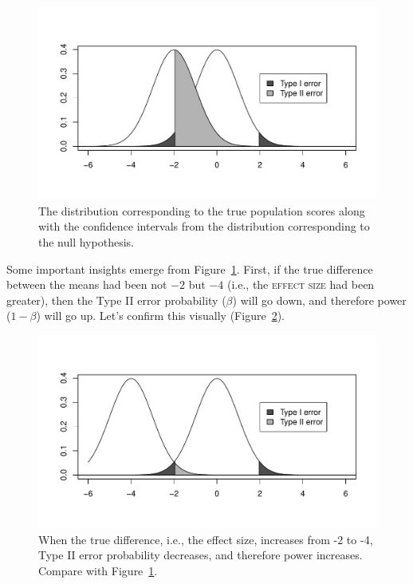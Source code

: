\documentclass[12pt]{book}\usepackage[]{graphicx}\usepackage[]{color}
\makeatletter
\def\maxwidth{ %
  \ifdim\Gin@nat@width>\linewidth
    \linewidth
  \else
    \Gin@nat@width
  \fi
}
\newenvironment{knitrout}{}{} %
\makeatother
\begin{document}
\begin{figure}[!htbp]
\centering 
\begin{knitrout}
\color{fgcolor}
\includegraphics[width=\maxwidth]{figure/unnamed-chunk-62-1} 

\end{knitrout}
  \caption{The distribution corresponding to the true population
    scores along with the confidence intervals from the distribution
    corresponding to the null hypothesis.}
  \label{fig:nullvstrue2}
\end{figure}

Some important insights emerge from  Figure~\ref{fig:nullvstrue2}.  First, if the true
difference between the means had been not $-2$ but $-4$ (i.e., the
 \textsc{effect size} had been greater), then the Type II
error probability ($\beta$) will go down, and therefore power
($1-\beta$) will go up.  Let's confirm this visually (Figure~\ref{fig:nullvstrue3}). 



\begin{figure}[!htbp]
\centering 
\begin{knitrout}
\color{fgcolor}
\includegraphics[width=\maxwidth]{figure/unnamed-chunk-63-1} 

\end{knitrout}
  \caption{When the true difference, i.e., the effect size, increases
    from -2 to -4, Type II error probability decreases, and therefore
    power increases. Compare with Figure~\ref{fig:nullvstrue2}.}
  \label{fig:nullvstrue3}
\end{figure}
\end{document}
